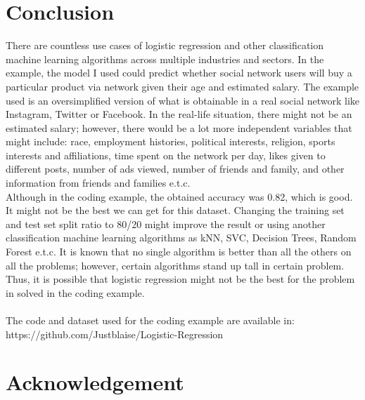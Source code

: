 \documentclass[conference]{IEEEtran}
\begin{document}
\section{Conclusion}
There are countless use cases of logistic regression and other classification machine learning algorithms across multiple industries and sectors. In the example,  the model I used could predict whether social network users will buy a particular product via network given their age and estimated salary. The example used is an oversimplified version of what is obtainable in a real social network like Instagram, Twitter or Facebook. In the real-life situation, there might not be an estimated salary; however, there would be a lot more independent variables that might include: race, employment histories, political interests, religion, sports interests and affiliations, time spent on the network per day, likes given to different posts, number of ads viewed, number of friends and family, and other information from friends and families e.t.c.\\
Although in the coding example, the obtained accuracy was 0.82, which is good. It might not be the best we can get for this dataset. Changing the training set and test set split ratio to 80/20 might improve the result or using another classification machine learning algorithms as kNN, SVC, Decision Trees, Random Forest e.t.c. It is known that no single algorithm is better than all the others on all the problems; however, certain algorithms stand up tall in certain problem\cite{bb6}. Thus, it is possible that logistic regression might not be the best for the problem in solved in the coding example.\\
\\
The code and dataset used for the coding example are available in:
https://github.com/Justblaise/Logistic-Regression

\section*{Acknowledgement}











\end{document}
